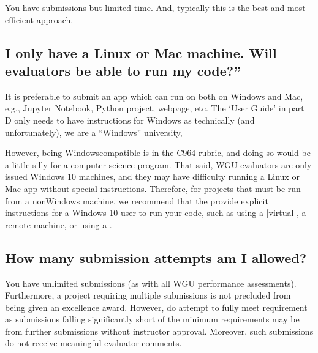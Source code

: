 \documentclass[letterpaper,10pt,english]{jupyterBook}
\begin{document}
\sphinxAtStartPar
You have  submissions but limited time. And, typically this is the best and most efficient approach.


\subsection{I only have a Linux or Mac machine. Will evaluators be able to run my code?”}
\label{\detokenize{task2_doc/task2_doc:i-only-have-a-linux-or-mac-machine-will-evaluators-be-able-to-run-my-code}}
\sphinxAtStartPar
It is preferable to submit an app which can run on both on Windows and Mac, e.g., Jupyter Notebook, Python project, webpage, etc. The ‘User Guide’ in part D only needs to have instructions for Windows as technically (and unfortunately), we are a “Windows” university,

\sphinxAtStartPar
However, being Windows\sphinxhyphen{}compatible is  in the C964 rubric, and doing so would be a little silly for a computer science program. That said, WGU evaluators are only issued Windows 10 machines, and they may have difficulty running a Linux or Mac app without special instructions. Therefore, for projects that must be run from a non\sphinxhyphen{}Windows machine, we recommend that the  provide explicit instructions for a Windows 10 user to run your code, such as using a {[}virtual , a remote machine, or using a .


\subsection{How many submission attempts am I allowed?}
\label{\detokenize{task2_doc/task2_doc:how-many-submission-attempts-am-i-allowed}}
\sphinxAtStartPar
You have unlimited submissions (as with all WGU performance assessments). Furthermore, a project requiring multiple submissions is not precluded from being given an excellence award. However, do attempt to fully meet  requirement as submissions falling significantly short of the minimum requirements may be  from further submissions without instructor approval. Moreover, such submissions do not receive meaningful evaluator comments.
\end{document}
